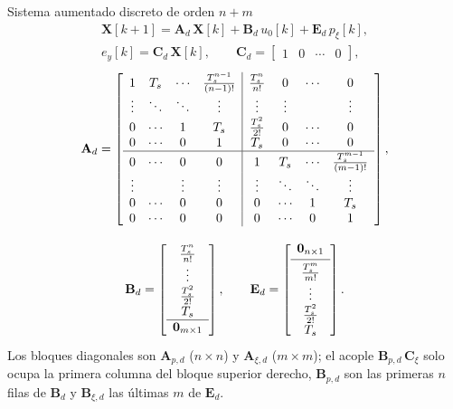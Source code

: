 \begin{recuadro}{Sistema aumentado discreto de orden $n+m$}
\begin{equation}
\begin{gathered}
\mathbf{X}[k+1] = \mathbf{A}_d\,\mathbf{X}[k] + \mathbf{B}_d\,u_0[k] + \mathbf{E}_d\,p_{\xi}[k],
\\[4pt]
e_y[k] = \mathbf{C}_d\,\mathbf{X}[k],
\qquad \mathbf{C}_d = \begin{bmatrix} 1 & 0 & \cdots & 0 \end{bmatrix},
\end{gathered}
\label{eq:disc_aumentado}
\end{equation}
\begin{equation}
\begin{gathered}
\mathbf{A}_d =
\left[\begin{array}{cccc|cccc}
1 & T_s & \cdots & \frac{T_s^{n-1}}{(n-1)!} & \frac{T_s^{n}}{n!} & 0 & \cdots & 0 \\
\vdots & \ddots & \ddots & \vdots & \vdots & \vdots & & \vdots \\
0 & \cdots & 1 & T_s & \frac{T_s^{2}}{2!} & 0 & \cdots & 0 \\
0 & \cdots & 0 & 1 & T_s & 0 & \cdots & 0 \\ \hline
0 & \cdots & 0 & 0 & 1 & T_s & \cdots & \frac{T_s^{m-1}}{(m-1)!} \\
\vdots & & \vdots & \vdots & \vdots & \ddots & \ddots & \vdots \\
0 & \cdots & 0 & 0 & 0 & \cdots & 1 & T_s \\
0 & \cdots & 0 & 0 & 0 & \cdots & 0 & 1
\end{array}\right],
\\[8pt]
\mathbf{B}_d =
\left[\begin{array}{c}
\frac{T_s^{n}}{n!} \\ \vdots \\ \frac{T_s^{2}}{2!} \\ T_s \\ \hline \mathbf{0}_{m \times 1}
\end{array}\right],
\qquad
\mathbf{E}_d =
\left[\begin{array}{c}
\mathbf{0}_{n \times 1} \\[2pt] \hline \frac{T_s^{m}}{m!} \rule{0pt}{3ex} \\ \vdots \\ \frac{T_s^{2}}{2!} \\ T_s
\end{array}\right] .
\end{gathered}
\label{eq:disc_matrices}
\end{equation}
Los bloques diagonales son $\mathbf{A}_{p,d}$ ($n \times n$) y
$\mathbf{A}_{\xi,d}$ ($m \times m$); el acople $\mathbf{B}_{p,d}\,\mathbf{C}_{\xi}$
solo ocupa la primera columna del bloque superior derecho, $\mathbf{B}_{p,d}$
son las primeras $n$ filas de $\mathbf{B}_d$ y $\mathbf{B}_{\xi,d}$ las últimas $m$
de $\mathbf{E}_d$.
\end{recuadro}

